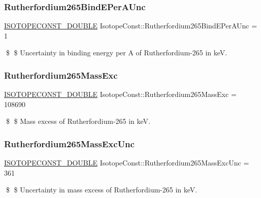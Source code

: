 \subsubsection{\texorpdfstring{Rutherfordium265\+Bind\+E\+Per\+A\+Unc}{Rutherfordium265BindEPerAUnc}}
{\footnotesize\ttfamily \mbox{\hyperlink{group___isotope_const-_macros_ga8f45a7272ce02c0b4c65c44636ed719a}{I\+S\+O\+T\+O\+P\+E\+C\+O\+N\+S\+T\+\_\+\+D\+O\+U\+B\+LE}} Isotope\+Const\+::\+Rutherfordium265\+Bind\+E\+Per\+A\+Unc = 1}

\$ \$ Uncertainty in binding energy per A of Rutherfordium-\/265 in keV. \mbox{\label{group___isotope_const-_rutherfordium-_rf265_ga6eaed071bf9bcb96a630dfae59b673e1}} 
\subsubsection{\texorpdfstring{Rutherfordium265\+Mass\+Exc}{Rutherfordium265MassExc}}
{\footnotesize\ttfamily \mbox{\hyperlink{group___isotope_const-_macros_ga8f45a7272ce02c0b4c65c44636ed719a}{I\+S\+O\+T\+O\+P\+E\+C\+O\+N\+S\+T\+\_\+\+D\+O\+U\+B\+LE}} Isotope\+Const\+::\+Rutherfordium265\+Mass\+Exc = 108690}

\$ \$ Mass excess of Rutherfordium-\/265 in keV. \mbox{\label{group___isotope_const-_rutherfordium-_rf265_ga7fe4d864cd1795fdcb85cb4cf71ac224}} 
\subsubsection{\texorpdfstring{Rutherfordium265\+Mass\+Exc\+Unc}{Rutherfordium265MassExcUnc}}
{\footnotesize\ttfamily \mbox{\hyperlink{group___isotope_const-_macros_ga8f45a7272ce02c0b4c65c44636ed719a}{I\+S\+O\+T\+O\+P\+E\+C\+O\+N\+S\+T\+\_\+\+D\+O\+U\+B\+LE}} Isotope\+Const\+::\+Rutherfordium265\+Mass\+Exc\+Unc = 361}

\$ \$ Uncertainty in mass excess of Rutherfordium-\/265 in keV. \mbox{\label{group___isotope_const-_rutherfordium-_rf265_gabfc884aa59c48aa60342093233ac59f0}} 

